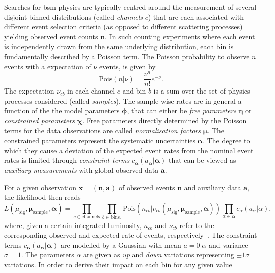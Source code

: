 Searches for \gls{bsm} physics are typically centred around the measurement of several disjoint binned distributions (called \textit{channels} $c$) that are each associated with different event selection criteria (as opposed to different scattering processes) yielding observed event counts $\boldsymbol{n}$. In such counting experiments where each event is independently drawn from the same underlying distribution, each bin is fundamentally described by a Poisson term. The Poisson probability to observe $n$ events with a expectation of $\nu$ events, is given by
\begin{equation}
	\mathrm{Pois}(n\vert\nu) = \frac{\nu^n}{n!}e^{-\nu}.
\end{equation}
The expectation $\nu_{cb}$ in each channel $c$ and bin $b$ is a sum over the set of physics processes considered (called \textit{samples}). The sample-wise rates are in general a function of the the model parameters $\boldsymbol{\phi}$, that can either be \textit{free parameters} $\boldsymbol{\eta}$ or \textit{constrained parameters} $\boldsymbol{\chi}$. Free parameters directly determined by the Poisson terms for the data observations are called \textit{normalisation factors} $\boldsymbol{\mu}$. The constrained parameters represent the systematic uncertainties $\boldsymbol{\alpha}$. The degree to which they cause a deviation of the expected event rates from the nominal event rates is limited through \textit{constraint terms} $c_{\boldsymbol{\alpha}}(a_{\boldsymbol{\alpha}}\vert\boldsymbol{\alpha})$ that can be viewed as \textit{auxiliary measurements} with global observed data $\boldsymbol{a}$. 

For a given observation $\boldsymbol{x} = (\boldsymbol{n},\boldsymbol{a})$ of observed events $\boldsymbol{n}$ and auxiliary data $\boldsymbol{a}$, the likelihood then reads
\begin{equation}
	L (\mu_{\mathrm{sig}}, \boldsymbol{\mu_\mathrm{sample}}, \boldsymbol{\alpha}) = \prod_{c\in\mathrm{channels}} \prod_{b\in\mathrm{bins_c}} \mathrm{Pois}(n_{cb}\vert\nu_{cb}(\mu_{\mathrm{sig}}, \boldsymbol{\mu_\mathrm{sample}}, \boldsymbol{\alpha})) \prod_{\alpha\in\boldsymbol{\alpha}}c_\alpha (a_\alpha\vert\alpha),
\end{equation}
where, given a certain integrated luminosity, $n_{cb}$ and $\nu_{cb}$ refer to the corresponding observed and expected rate of events, respectively~\cite{ATL-PHYS-PUB-2019-029}. The constraint terms $c_{\boldsymbol{\alpha}}(a_{\boldsymbol{\alpha}}\vert\boldsymbol{\alpha})$ are modelled by a Gaussian with mean $a = 0\vert\alpha$ and variance $\sigma = 1$. The parameters $\alpha$ are given as \textit{up} and \textit{down} variations representing $\pm1\sigma$ variations. In order to derive their impact on each bin for any given value 


